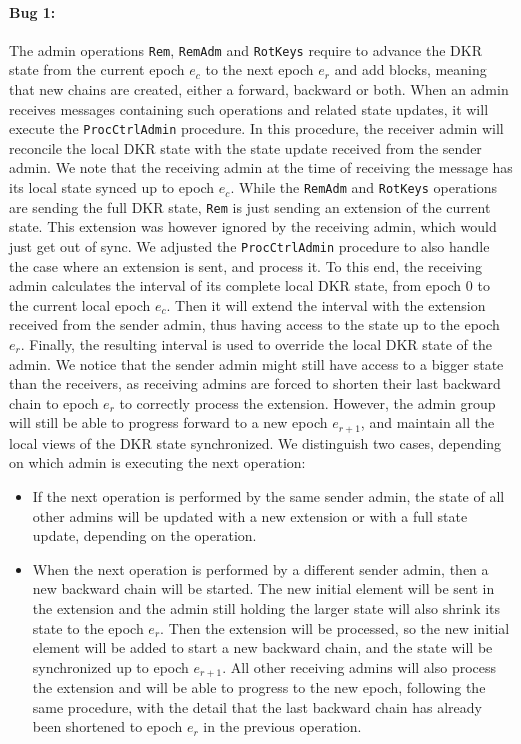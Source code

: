 \paragraph{Bug 1:} The admin operations \texttt{Rem}, \texttt{RemAdm} and
\texttt{RotKeys} require to advance the DKR state from the current epoch
$e_{c}$
to the next epoch $e_{r}$ and add blocks, meaning that new chains are created, 
either a forward, backward or both.
When an admin receives messages containing such operations and related
state updates, it will execute the \texttt{ProcCtrlAdmin} procedure.
In this procedure, the receiver admin will reconcile the local DKR state
with the state update received from the sender admin.
We note that the receiving admin at the time of receiving the message
has its local state synced up to epoch $e_{c}$.
While the \texttt{RemAdm} and \texttt{RotKeys} operations are sending 
the full DKR state, \texttt{Rem} is just sending an extension of the current state. 
This extension was however ignored by the receiving admin, 
which would just get out of sync. We adjusted the \texttt{ProcCtrlAdmin}
procedure to also handle the case where an extension is sent,
and process it. To this end, the receiving admin calculates the
interval of its complete local DKR state, from epoch 0 to the current
local epoch $e_c$. Then it will extend the interval with the extension
received from the sender admin, thus having access to the state up to
the epoch $e_r$. Finally, the resulting interval is used to override the
local DKR state of the admin. 
We notice that the sender admin might still
have access to a bigger state than the receivers,
as receiving admins are forced to shorten their last backward chain
to epoch $e_r$ to correctly process the extension.
However, the admin group will still be able to progress forward
to a new epoch $e_{r+1}$, and maintain all the local views of the DKR state
synchronized. We distinguish two cases, depending on which admin is
executing the next operation:

\begin{itemize}
    \item If the next operation is performed by the same sender admin,
the state of all other admins will be updated with a new extension or with
a full state update, depending on the operation.

\item When the next operation is performed by a different sender admin,
then a new backward chain will be started. The new initial element will 
be sent in the extension and the admin still holding the larger state
will also shrink its state to the epoch $e_r$. 
Then the extension will be processed, so the new initial element
will be added to start a new backward chain, and the state will be
synchronized up to epoch $e_{r+1}$. All other receiving admins will
also process the extension and will be able to progress to the new epoch,
following the same procedure, with the detail that the last backward chain
has already been shortened to epoch $e_r$ in the previous operation.

\end{itemize}


